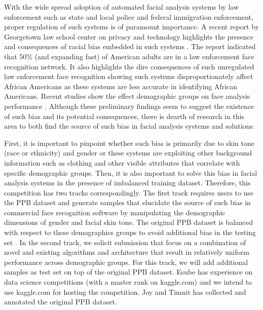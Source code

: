 \documentclass[11pt, oneside]{article}
\makeatletter
\let\@internalcite\cite
\def\cite{\def\citeauthoryear##1##2{##1, ##2}\@internalcite}
\makeatother
\begin{document}
With the wide spread adoption of automated facial analysis systems by law enforcement such as state and local police and federal immigration enforcement, proper regulation of such systems is of paramount importance. A recent report by Georgetown law school center on privacy and technology highlights the presence and consequences of racial bias embedded in such systems \cite{garvie2016perpetual}. The report indicated that 50\% (and expanding fast) of American adults are in a law enforcement face recognition network. It also highlights the dire consequences of such unregulated law enforcement face recognition showing such systems disproportionately affect African Americans as these systems are less accurate in identifying African Americans. Recent studies show the effect demographic groups on face analysis performance \cite{han2015demographic} \cite{farinella2012demographic} \cite{klare2012face}. Although these preliminary findings seem to suggest the existence of such bias and its potential consequences, there is dearth of research in this area to both find the source of such bias in facial analysis systems and solutions. 

First, it is important to pinpoint whether such bias is primarily due to skin tone (race or ethnicity) and gender or these systems are exploiting other background information such as clothing and other visible attributes that correlate with specific demographic groups. Then, it is also important to solve this bias in facial analysis systems in the presence of imbalanced training dataset. Therefore, this competition has two tracks correspondingly. The first track requires users to use the PPB dataset and generate samples that elucidate the source of such bias in commercial face recognition software by manipulating the demographic dimensions of gender and facial skin tone. The original PPB dataset is balanced with respect to these demographics groups to avoid additional bias in the testing set \cite{buolamwini2018gender}. In the second track, we solicit submission that focus on a combination of novel and existing algorithms and architecture that result in relatively uniform performance across demographic groups. For this track, we will add additional samples as test set on top of the original PPB dataset. Esube has experience on data science competitions (with a master rank on kaggle.com) and we intend to use kaggle.com for hosting the competition. Joy and Timnit has collected and annotated the original PPB dataset.
\end{document}
